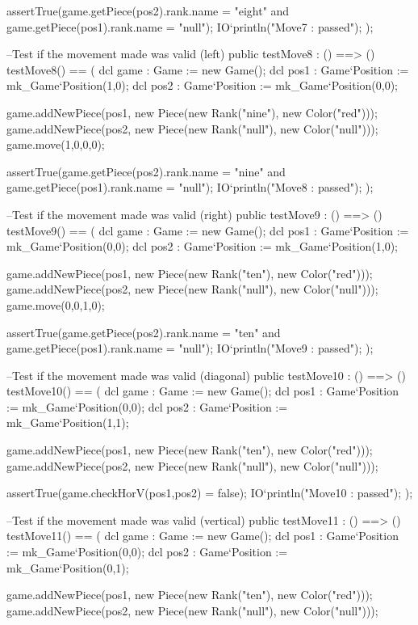 \begin{vdm_al}
    assertTrue(game.getPiece(pos2).rank.name = "eight" and game.getPiece(pos1).rank.name = "null");
    IO`println("Move7 : passed");
   );
   
  --Test if the movement made was valid (left) 
  public testMove8 : () ==> ()
   testMove8() ==
   (
    dcl game : Game := new Game();
    dcl pos1 : Game`Position := mk_Game`Position(1,0);
    dcl pos2 : Game`Position := mk_Game`Position(0,0);
    
    game.addNewPiece(pos1, new Piece(new Rank("nine"), new Color("red")));
    game.addNewPiece(pos2, new Piece(new Rank("null"), new Color("null")));
    game.move(1,0,0,0);
    
    assertTrue(game.getPiece(pos2).rank.name = "nine" and game.getPiece(pos1).rank.name = "null");
    IO`println("Move8 : passed");
   );
   
  --Test if the movement made was valid (right) 
  public testMove9 : () ==> ()
   testMove9() ==
   (
    dcl game : Game := new Game();
    dcl pos1 : Game`Position := mk_Game`Position(0,0);
    dcl pos2 : Game`Position := mk_Game`Position(1,0);
    
    game.addNewPiece(pos1, new Piece(new Rank("ten"), new Color("red")));
    game.addNewPiece(pos2, new Piece(new Rank("null"), new Color("null")));
    game.move(0,0,1,0);
    
    assertTrue(game.getPiece(pos2).rank.name = "ten" and game.getPiece(pos1).rank.name = "null");
    IO`println("Move9 : passed");
   );
   
  --Test if the movement made was valid (diagonal) 
  public testMove10 : () ==> ()
   testMove10() ==
   (
    dcl game : Game := new Game();
    dcl pos1 : Game`Position := mk_Game`Position(0,0);
    dcl pos2 : Game`Position := mk_Game`Position(1,1);
    
    game.addNewPiece(pos1, new Piece(new Rank("ten"), new Color("red")));
    game.addNewPiece(pos2, new Piece(new Rank("null"), new Color("null")));
    
    assertTrue(game.checkHorV(pos1,pos2) = false);
    IO`println("Move10 : passed");
   );
  
  --Test if the movement made was valid (vertical)
  public testMove11 : () ==> ()
   testMove11() ==
   (
    dcl game : Game := new Game();
    dcl pos1 : Game`Position := mk_Game`Position(0,0);
    dcl pos2 : Game`Position := mk_Game`Position(0,1);
    
    game.addNewPiece(pos1, new Piece(new Rank("ten"), new Color("red")));
    game.addNewPiece(pos2, new Piece(new Rank("null"), new Color("null")));
    

\end{vdm_al}
